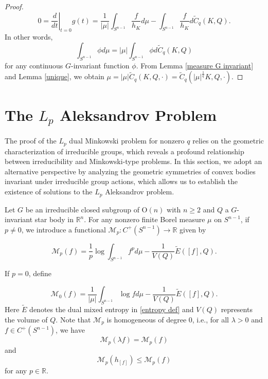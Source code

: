 \documentclass[12pt, reqno]{amsart}
\theoremstyle{definition}
\theoremstyle{remark}
\numberwithin{equation}{section}
\newcommand{\R}{\mathbb{R}}
\newcommand{\Rn}{\mathbb{R}^{n}}
\newcommand{\Sn}{S^{n-1}}
\newcommand{\On}{\mathrm{O}(n)}
\begin{document}
\begin{proof}
	\begin{equation*}
		0=\left.\frac{d}{d t}\right|_{t=0}	g(t)=\frac{1}{|\mu|}\int_{S^{n-1}}\frac{f}{h_{K}}d\mu-\int_{S^{n-1}}\frac{f}{h_{K}}d\widetilde{C}_{q}(K,Q).
	\end{equation*}
	In other words,
	\begin{equation}
		\int_{S^{n-1}}\phi d\mu=|\mu| \int_{S^{n-1}}\phi d\widetilde{C}_{q}(K,Q)
	\end{equation}
	for any  continuous $G$-invariant function $\phi$. From Lemma \ref{measure G invariant} and Lemma \ref{unique}, we obtain $\mu=|\mu|\widetilde{C}_{q}(K,Q,\cdot)=\widetilde{C}_{q}(|\mu|^{\frac{1}{q}}K,Q,\cdot)$.
\end{proof}

\vspace{1\baselineskip} 

\section{The $L_{p}$ Aleksandrov Problem}
The proof of the $L_p$ dual Minkowski problem for nonzero $q$ relies on the geometric characterization of irreducible groups, which reveals a profound relationship between irreducibility and Minkowski-type problems. In this section, we adopt an alternative perspective by analyzing the geometric symmetries of convex bodies invariant under irreducible group actions, which allows us to establish the existence of solutions to the $L_p$ Aleksandrov problem.

Let $G$ be an irreducible closed subgroup of $\On$ with $n\ge2$ and $Q$ a $G$-invariant star body in $\Rn$.
For any nonzero finite Borel measure $\mu$ on $\Sn$, if  $p \neq 0$, we introduce a functional $\mathcal{M}_{p}: C^{+}(\Sn) \to \R$ given by

\begin{equation}\label{Mp}
	\mathcal{M}_{p}(f) = \frac{1}{p} \log \int_{S^{n-1}} f^{p}  d\mu - \frac{1}{V(Q)}  \widetilde{E}([f], Q).
\end{equation}

If  $p=0$,  define 	

\begin{equation}\label{M0}
	\mathcal{M}_{0}(f) = \frac{1}{|\mu|} \int _{S^{n-1}}\log f  d\mu - \frac{1}{V(Q)}  \widetilde{E}([f], Q).
\end{equation}
Here $\widetilde{E}$ denotes the dual mixed entropy in  \eqref{entropy def} and $V(Q)$ represents the volume of $Q$.
Note that $\mathcal{M}_{p}$ is homogeneous of degree $0$, i.e., for all $\lambda >0$ and $f\in C^{+}(\Sn)$, we have 
\begin{equation}\label{homoM}
	\mathcal{M}_{p}(\lambda f) = \mathcal{M}_{p}(f)
\end{equation}
and
	\begin{equation}\label{supM}
		\mathcal{M}_{p}(h_{[f]})\le \mathcal{M}_{p}(f)
	\end{equation}
for any $p\in \mathbb{R}$.
\end{document}
